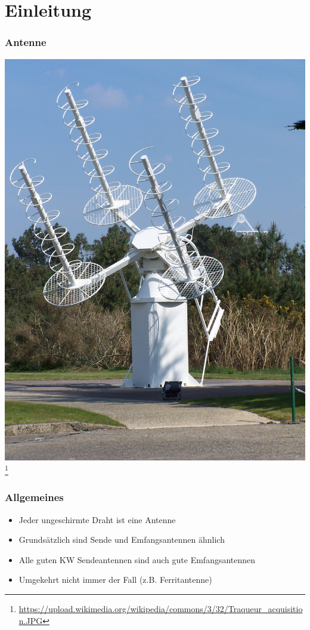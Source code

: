 

\subtitle{Technik 11: \\
           Antennentechnik \\[2em]}
\date{Stand 30.11.2014}



\section*{Einleitung}

\begin{frame}
    \frametitle{Antenne}
      \begin{center}
        \includegraphics[width=.5\textwidth]{e11/Traqueur_acquisition.JPG}
        \footnote{\tiny \url{https://upload.wikimedia.org/wikipedia/commons/3/32/Traqueur_acquisition.JPG}}
    \end{center}
\end{frame}
  

\begin{frame}
    \frametitle{Allgemeines}
	\begin{itemize}
		\item Jeder ungeschirmte Draht ist eine Antenne
        \item Grundsätzlich sind Sende und Emfangsantennen ähnlich
        \item Alle guten KW Sendeantennen sind auch gute Emfangsantennen
       	\item Umgekehrt nicht immer der Fall (z.B. Ferritantenne)
    \end{itemize}
\end{frame}

